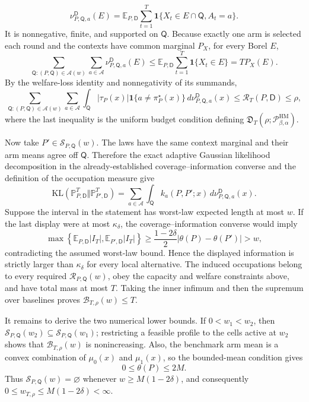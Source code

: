 \[
\nu^{\mathsf D}_{P,\mathsf Q,a}(E)
=\mathbb E_{P,\mathsf D}\sum_{t=1}^T
\mathbf 1\{X_t\in E\cap\mathsf Q,A_t=a\}.
\]
It is nonnegative, finite, and supported on \(\mathsf Q\).  Because exactly one arm is selected each round and the contexts have common marginal \(P_X\), for every Borel \(E\),
\[
\sum_{\mathsf Q:(P,\mathsf Q)\in\mathscr A(w)}
\sum_{a\in\mathcal A}\nu^{\mathsf D}_{P,\mathsf Q,a}(E)
\le\mathbb E_{P,\mathsf D}\sum_{t=1}^T\mathbf 1\{X_t\in E\}
=T P_X(E).
\]
By the welfare-loss identity and nonnegativity of its summands,
\[
\sum_{\mathsf Q:(P,\mathsf Q)\in\mathscr A(w)}
\sum_{a\in\mathcal A}\int_{\mathsf Q}
|\tau_P(x)|\mathbf 1\{a\ne\pi_P^\star(x)\}
\,d\nu^{\mathsf D}_{P,\mathsf Q,a}(x)
\le\mathcal R_T(P,\mathsf D)\le\rho,
\]
where the last inequality is the uniform budget condition defining \(\mathfrak D_T(\rho;\mathcal P_{\beta,\alpha}^{\mathrm{HM}})\).

Now take \(P'\in\mathcal S_{P,\mathsf Q}(w)\).  The laws have the same context marginal and their arm means agree off \(\mathsf Q\).  Therefore the exact adaptive Gaussian likelihood decomposition in the already-established coverage--information converse and the definition of the occupation measure give
\[
\mathrm{KL}(\mathbb P_{P,\mathsf D}^{T}\Vert\mathbb P_{P',\mathsf D}^{T})
=\sum_{a\in\mathcal A}\int_{\mathsf Q}
k_a(P,P';x)\,d\nu^{\mathsf D}_{P,\mathsf Q,a}(x).
\]
Suppose the interval in the statement has worst-law expected length at most \(w\).  If the last display were at most \(\kappa_\delta\), the coverage--information converse would imply
\[
\max\left\{\mathbb E_{P,\mathsf D}|I_T|,
\mathbb E_{P',\mathsf D}|I_T|\right\}
\ge\frac{1-2\delta}{2}|\theta(P)-\theta(P')|>w,
\]
contradicting the assumed worst-law bound.  Hence the displayed information is strictly larger than \(\kappa_\delta\) for every local alternative.  The induced occupations belong to every required \(\mathcal R_{P,\mathsf Q}(w)\), obey the capacity and welfare constraints above, and have total mass at most \(T\).  Taking the inner infimum and then the supremum over baselines proves \(\mathcal B_{T,\rho}(w)\le T\).

It remains to derive the two numerical lower bounds.  If \(0<w_1<w_2\), then \(\mathcal S_{P,\mathsf Q}(w_2)\subseteq\mathcal S_{P,\mathsf Q}(w_1)\); restricting a feasible profile to the cells active at \(w_2\) shows that \(\mathcal B_{T,\rho}(w)\) is nonincreasing.  Also, the benchmark arm mean is a convex combination of \(\mu_0(x)\) and \(\mu_1(x)\), so the bounded-mean condition gives
\[
0\le\theta(P)\le2M.
\]
Thus \(\mathcal S_{P,\mathsf Q}(w)=\varnothing\) whenever \(w\ge M(1-2\delta)\), and consequently \(0\le w_{T,\rho}\le M(1-2\delta)<\infty\).

